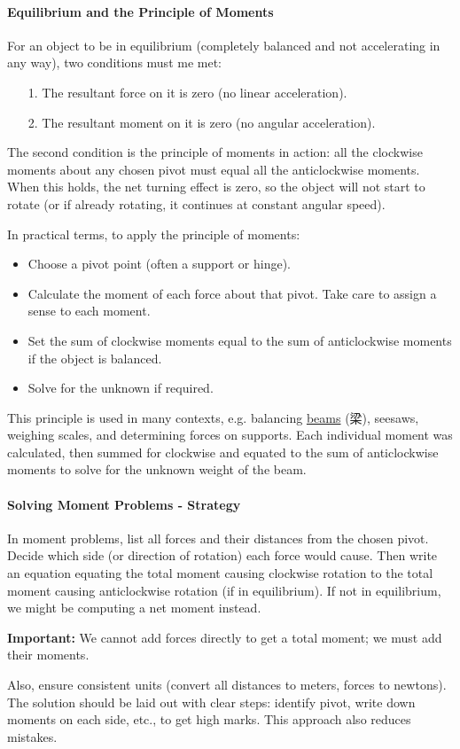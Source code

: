 \paragraph{Equilibrium and the Principle of Moments}
For an object to be in equilibrium (completely balanced and not accelerating in any way), two conditions must me met:
\begin{itemize}
    \item[1.] The resultant force on it is zero (no linear acceleration).
    \item[2.] The resultant moment on it is zero (no angular acceleration).
\end{itemize} \par
The second condition is the principle of moments in action: all the clockwise moments about any chosen pivot must equal all the
anticlockwise moments. When this holds, the net turning effect is zero, so the object will not start to rotate (or if already
rotating, it continues at constant angular speed). \par
In practical terms, to apply the principle of moments:
\begin{itemize}
    \item Choose a pivot point (often a support or hinge).
    \item Calculate the moment of each force about that pivot. Take care to assign a sense to each moment.
    \item Set the sum of clockwise moments equal to the sum of anticlockwise moments if the object is balanced.
    \item Solve for the unknown if required.
\end{itemize} \par
This principle is used in many contexts, e.g. balancing \underline{beams} (梁), seesaws, weighing scales, and determining forces
on supports. Each individual moment was calculated, then summed for clockwise and equated to the sum of anticlockwise moments to
solve for the unknown weight of the beam.

\paragraph{Solving Moment Problems - Strategy}
In moment problems, list all forces and their distances from the chosen pivot. Decide which side (or direction of rotation) each
force would cause. Then write an equation equating the total moment causing clockwise rotation to the total moment causing
anticlockwise rotation (if in equilibrium). If not in equilibrium, we might be computing a net moment instead. \par
\textbf{Important:} We cannot add forces directly to get a total moment; we must add their moments. \par
Also, ensure consistent units (convert all distances to meters, forces to newtons). The solution should be laid out with clear
steps: identify pivot, write down moments on each side, etc., to get high marks. This approach also reduces mistakes.

